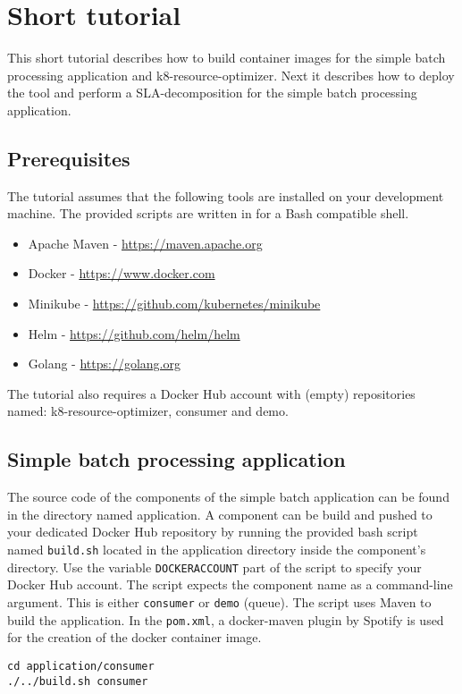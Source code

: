 \chapter{Short tutorial}
This short tutorial describes how to build  container images for the simple batch processing application and k8-resource-optimizer. Next it describes how to deploy the tool and perform a SLA-decomposition for the simple batch processing application.
\section{Prerequisites}
The tutorial assumes that the following tools are installed on your development machine. The provided scripts are written in for a Bash compatible shell.
\begin{itemize}
    \item Apache Maven - \url{https://maven.apache.org}
    \item Docker - \url{https://www.docker.com}
    \item Minikube - \url{https://github.com/kubernetes/minikube}
    \item Helm  - \url{https://github.com/helm/helm}
    \item Golang - \url{https://golang.org}
\end{itemize}
The tutorial also requires a Docker Hub account with (empty) repositories named: k8-resource-optimizer, consumer and demo.

\section{Simple batch processing application}
The source code of the components of the simple batch application can be found in the directory named application. 
A component can be build and pushed to your dedicated Docker Hub repository by running the provided bash script named \texttt{build.sh} located in the application directory inside the component's directory. Use the variable \texttt{DOCKERACCOUNT} part of the script to specify your Docker Hub account. The script expects the component name as a command-line argument. This is either \texttt{consumer} or \texttt{demo} (queue). The script uses Maven to build the application. In the \texttt{pom.xml}, a docker-maven plugin by Spotify is used for the creation of the docker container image.

\begin{lstlisting}
cd application/consumer
./../build.sh consumer
\end{lstlisting}

